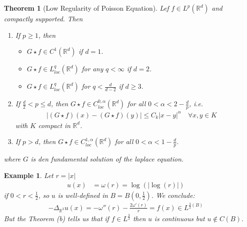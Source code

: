 \documentclass{report}
\theoremstyle{tommy}
\newtheorem{thm}[defn]{Theorem}
\newtheorem{eg}[defn]{Example}
\begin{document}
  \begin{thm}[Low Regularity of Poisson Equation]\label{Low Regularity for Poisson Equation}
    Lef \(f \in L^p(\mathbb{R}^d)\) and compactly supported. Then
    \begin{enumerate}[label=\alph*)]
      \item If \(p \ge 1\), then \begin{itemize}
        \item \(G \star f \in C^1(\mathbb{R}^d)\) if \(d = 1\).
        \item \(G \star f \in L_{loc}^q(\mathbb{R}^d)\) for any \(q < \infty\) if \(d = 2\).
        \item \(G \star f \in L_{loc}^q(\mathbb{R}^d)\) for \(q < \frac{d}{d-2}\) if \(d \ge 3\).
      \end{itemize}
      \item If \(\frac{d}{2} < p \le d\), then \(G \star f \in C_{loc}^{0, \alpha}(\mathbb{R}^d)\) for all \(0 < \alpha < 2 - \frac{d}{p}\), i.e.
      \begin{align*}
        |(G \star f)(x) - (G \star f)(y) | \le C_k|x-y|^\alpha \quad \forall x,y \in K
      \end{align*}
      with \(K\) compact in \(\mathbb{R}^d\).
      \item If \(p > d\), then \(G \star f \in C_{loc}^{1, \alpha} (\mathbb{R}^d)\) for all \(0 < \alpha < 1 - \frac{d}{p}\).
    \end{enumerate}
    where \(G\) is den fundamental solution of the laplace equation.
  \end{thm}

  \begin{eg}
    Let \(r = |x|\)
    \begin{align*}
      u(x) 
      &= \omega(r) = \log(|\log(r)|)
    \end{align*}
    if \(0 < r < \frac{1}{2}\), so \(u\) is well-defined in \(B = B(0, \frac{1}{2})\). We conclude:
    \begin{align*}
      - \Delta_{\mathbb{R}^3} u(x) = - \omega''(r) - \frac{2 \omega'(r)}{r} = f(x) \in L^{\frac{3}{2}(B)}
    \end{align*}
    But the Theorem (b) tells us that if \(f \in L^{\frac{3}{2}}\) then \(u\) is continuous but \(u \notin C(B)\).
  \end{eg}
\end{document}

